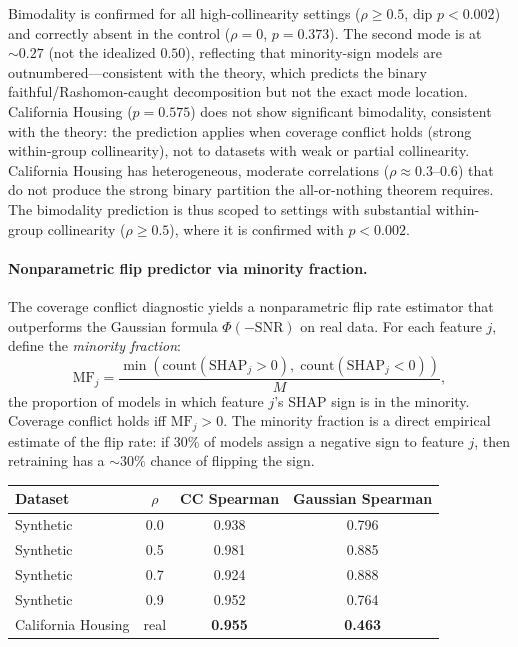 \documentclass{article}
\begin{document}
Bimodality is confirmed for all high-collinearity settings ($\rho \geq 0.5$, dip $p < 0.002$) and correctly absent in the control ($\rho = 0$, $p = 0.373$).
The second mode is at ${\sim}0.27$ (not the idealized $0.50$), reflecting that minority-sign models are outnumbered---consistent with the theory, which predicts the binary faithful/Rashomon-caught decomposition but not the exact mode location.
California Housing ($p = 0.575$) does not show significant bimodality, consistent with the theory: the prediction applies when coverage conflict holds (strong within-group collinearity), not to datasets with weak or partial collinearity. California Housing has heterogeneous, moderate correlations ($\rho \approx 0.3$--$0.6$) that do not produce the strong binary partition the all-or-nothing theorem requires.
The bimodality prediction is thus scoped to settings with substantial within-group collinearity ($\rho \geq 0.5$), where it is confirmed with $p < 0.002$.

\paragraph{Nonparametric flip predictor via minority fraction.}
The coverage conflict diagnostic yields a nonparametric flip rate estimator that outperforms the Gaussian formula $\Phi(-\text{SNR})$ on real data.
For each feature $j$, define the \emph{minority fraction}:
\[
    \text{MF}_j = \frac{\min(\text{count}(\text{SHAP}_j > 0),\; \text{count}(\text{SHAP}_j < 0))}{M},
\]
the proportion of models in which feature $j$'s SHAP sign is in the minority.
Coverage conflict holds iff $\text{MF}_j > 0$.
The minority fraction is a direct empirical estimate of the flip rate: if 30\% of models assign a negative sign to feature $j$, then retraining has a ${\sim}30\%$ chance of flipping the sign.

\begin{center}
\small
\begin{tabular}{@{}lccc@{}}
\toprule
Dataset & $\rho$ & CC Spearman & Gaussian Spearman \\
\midrule
Synthetic & 0.0 & 0.938 & 0.796 \\
Synthetic & 0.5 & 0.981 & 0.885 \\
Synthetic & 0.7 & 0.924 & 0.888 \\
Synthetic & 0.9 & 0.952 & 0.764 \\
California Housing & real & \textbf{0.955} & \textbf{0.463} \\
\bottomrule
\end{tabular}
\end{center}
\end{document}
